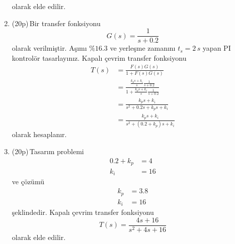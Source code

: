 \begin{enumerate}[\bfseries S1.]
	      olarak elde edilir.
	\item (20p)\,Bir transfer fonksiyonu
	      \begin{equation}
		      G(s)=\frac{1}{s+0.2}
	      \end{equation}
	      olarak verilmiştir. Aşımı $\%16.3$ ve yerleşme zamanını $t_s=2\,s$ yapan PI kontrolör tasarlayınız. Kapalı çevrim transfer fonksiyonu
	      \begin{equation}
		      \begin{split}
			      T(s) & =\frac{F(s)G(s)}{1+F(s)G(s)}                                                   \\
			           & =\frac{\frac{k_ps+k_i}{s}\frac{1}{s+0.2}}{1+\frac{k_ps+k_i}{s}\frac{1}{s+0.2}} \\
			           & =\frac{k_ps+k_i}{s^2+0.2s+k_ps+k_i}                                            \\
			           & =\frac{k_ps+k_i}{s^2+(0.2+k_p)s+k_i}
		      \end{split}
	      \end{equation}
	      olarak hesaplanır.
	\item (20p)\,Tasarım problemi
	      \begin{equation}
		      \begin{split}
			      0.2+k_p & =4  \\
			      k_i     & =16
		      \end{split}
	      \end{equation}
	      ve çözümü
	      \begin{equation}
		      \begin{split}
			      k_p & =3.8 \\
			      k_i & =16
		      \end{split}
	      \end{equation}
	      şeklindedir. Kapalı çevrim transfer fonksiyonu
	      \begin{equation}
		      T(s)=\frac{4s+16}{s^2+4s+16}
	      \end{equation}
	      olarak elde edilir.
\end{enumerate}
